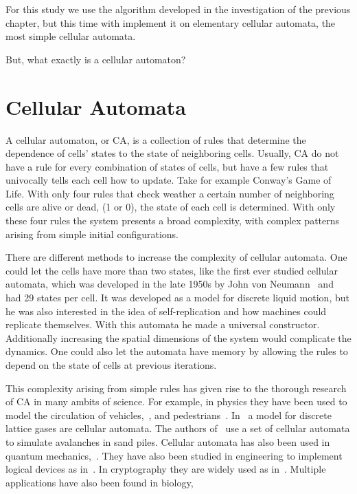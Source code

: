 For this study we use the algorithm developed in the investigation of the previous chapter, but this time with implement it on elementary cellular automata, the most simple cellular automata.

But, what exactly is a cellular automaton?

\section{Cellular Automata}


A cellular automaton, or CA, is a collection of rules that determine the dependence of cells' states to the state of neighboring cells.
Usually, CA do not have a rule for every combination of states of cells, but have a few rules that univocally tells each cell how to update. Take for example Conway's Game of Life. With only four rules that check weather a certain number of neighboring cells are alive or dead, (1 or 0), the state of each cell is determined. With only these four rules the system presents a broad complexity, with complex patterns arising from simple initial configurations. 


There are different methods to increase the complexity of cellular automata. One could let the cells have more than two states, like the first ever studied cellular automata, which was developed in the late 1950s by John von Neumann~\cite{VonNeummanCA} and had 29 states per cell. It was developed as a model for discrete liquid motion, but he was also interested in the idea of self-replication and how machines could replicate themselves. With this automata he made a universal constructor. Additionally increasing the spatial dimensions of the system would complicate the dynamics. One could also let the automata have memory by allowing the rules to depend on the state of cells at previous iterations.

This complexity arising from simple rules has given rise to the thorough research of CA in many ambits of science. For example, in physics they have been used to model the circulation of vehicles,~\cite{PhysicsCA1}, and pedestrians~\cite{PhysicsCA2}. In~\cite{PhysicsCA3} a model for discrete lattice gases are cellular automata. The authors of~\cite{PhysicsCA4} use a set of cellular automata to simulate avalanches in sand piles. Cellular automata has also been used in quantum mechanics,~\cite{PhysicsCA5}. They have also been studied in engineering to implement logical devices as in~\cite{EngineeringCA1}. In cryptography they are widely used as in~\cite{CryptographyCA1, CryptographyCA2Lya}. Multiple applications have also been found in biology,~\cite{BiologyCA1, BiologyCA2, BiologyCA3}


